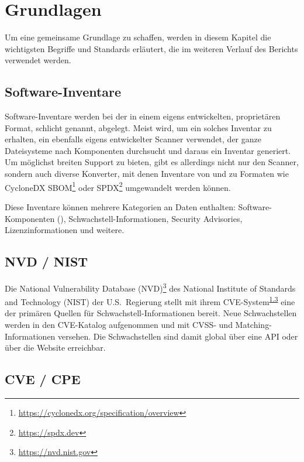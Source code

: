 \section{Grundlagen} \label{sec:projektbericht-grundlagen}

Um eine gemeinsame Grundlage zu schaffen, werden in diesem Kapitel die wichtigsten Begriffe und Standards erläutert, die im weiteren Verlauf des Berichts verwendet werden.

\subsection{Software-Inventare} \label{subsec:projektbericht-grundlagen-inventories}

Software-Inventare werden bei der {\metaeffekt} in einem eigens entwickelten, proprietären Format, schlicht  genannt, abgelegt.
Meist wird, um ein solches Inventar zu erhalten, ein ebenfalls eigens entwickelter Scanner verwendet, der ganze Dateisysteme nach Komponenten durchsucht und daraus ein Inventar generiert.
Um möglichst breiten Support zu bieten, gibt es allerdings nicht nur den Scanner, sondern auch diverse Konverter, mit denen Inventare von und zu Formaten wie CycloneDX SBOM\footnote{\url{https://cyclonedx.org/specification/overview}} oder SPDX\footnote{\url{https://spdx.dev}} umgewandelt werden können.

Diese Inventare können mehrere Kategorien an Daten enthalten: Software-Komponenten (), Schwachstell-Informationen, Security Advisories, Lizenzinformationen und weitere.

\subsection{NVD / NIST} \label{subsec:projektbericht-grundlagen-nvd-nist}

Die National Vulnerability Database (NVD)\footnote{\url{https://nvd.nist.gov}} des National Institute of Standards and Technology (NIST) der U.S.\ Regierung stellt mit ihrem CVE-System\textsuperscript{\ref{subsec:projektbericht-grundlagen-cve-cpe}} eine der primären Quellen für Schwachstell-Informationen bereit.
Neue Schwachstellen werden in den CVE-Katalog aufgenommen und mit CVSS- und Matching-Informationen versehen.
Die Schwachstellen sind damit global über eine API oder über die Website erreichbar.

\subsection{CVE / CPE} \label{subsec:projektbericht-grundlagen-cve-cpe}

